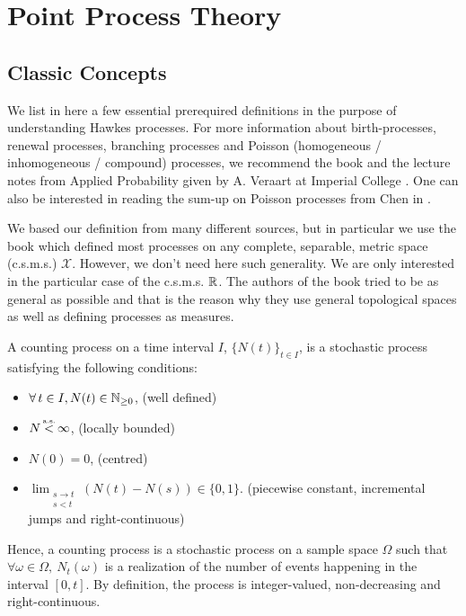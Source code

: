 \section{Point Process Theory}
\subsection{Classic Concepts}
We list in here a few essential prerequired definitions in the purpose of understanding Hawkes processes. For more information about birth-processes, renewal processes, branching processes and Poisson (homogeneous / inhomogeneous / compound) processes, we recommend the book \cite{Grimmett} and the lecture notes from Applied Probability given by A. Veraart at Imperial College \cite{Veraart}. One can also be interested in reading the sum-up on Poisson processes from Chen in \cite{simulchen}.

We based our definition from many different sources, but in particular we use the book \cite{daley} which defined most processes on any complete, separable, metric space (c.s.m.s.) $\mathcal X$. However, we don't need here such generality. We are only interested in the particular case of the c.s.m.s. $\mathbb{R}$. The authors of the book \cite{daley} tried to be as general as possible and that is the reason why they use general topological spaces as well as defining processes as measures. 

\begin{definition}
A counting process on a time interval $I$, $\{N(t)\}_{t \in I}$, is a stochastic process satisfying the following conditions: 
\begin{itemize}
\item $ \forall t \in I, N(t) \in \N $, (well defined)
\item $N  \stackrel{\mathclap{\mbox{\normalfont\tiny a.s.}}}{<} \infty$, (locally bounded)
\item $ N(0) = 0$, (centred)
\item $ \lim_{ \substack{ s \to t \\ s < t}  } \left ( N(t) - N(s) \right ) \in \{0,1\}$. (piecewise constant, incremental jumps and right-continuous)
\end{itemize}
\end{definition}

Hence, a counting process is a stochastic process on a sample space $\Omega$ such that $ \forall \omega \in \Omega, \ N_t( \omega ) $ is a realization of the number of events happening in the interval $ [ 0,t ]$. By definition, the process is integer-valued, non-decreasing and right-continuous. 



